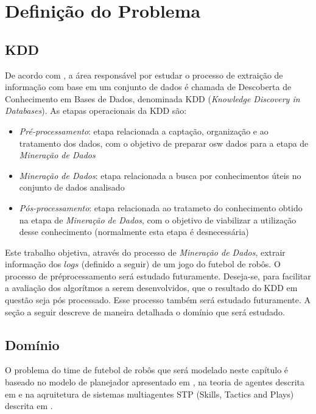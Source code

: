 \chapter{Definição do Problema}\label{cap:def_problema}

\section{KDD}

De acordo com \cite{passos2005datamining}, a área responsável por estudar o processo de extraição de informação com base em um conjunto de dados é
chamada de Descoberta de Conhecimento em Bases de Dados, denominada
KDD (\textit{Knowledge Discovery in Databases}). As etapas operacionais da KDD são:
\begin{itemize}
  \item \textit{Pré-processamento}: etapa relacionada a captação,
        organização e ao tratamento dos dados, com o objetivo de
        preparar osw dados para a etapa de \textit{Mineração de Dados}
  \item \textit{Mineração de Dados}: etapa relacionada a busca por
        conhecimentos úteis no conjunto de dados analisado
  \item \textit{Pós-processamento}: etapa relacionada ao tratameto do
        conhecimento obtido na etapa de \textit{Mineração de Dados}, com
        o objetivo de viabilizar a utilização desse conhecimento
        (normalmente esta etapa é desnecessária)
\end{itemize}

Este trabalho objetiva, através do processo de \textit{Mineração de Dados}, extrair informação dos $logs$ (definido a seguir)
de um jogo do futebol de robôs. O processo de préprocessamento será estudado futuramente. Deseja-se, para facilitar a avaliação dos algorítmos a serem desenvolvidos, que o resultado do KDD em questão seja pós processado. Esse processo também será estudado futuramente.
A seção a seguir descreve de maneira detalhada o domínio que será estudado.

\section{Domínio}

O problema do time de futebol de robôs que será modelado neste capítulo é baseado no modelo de planejador apresentado em \cite{zickler}, na teoria
de agentes descrita em \cite{russellnorvig} e na aqruitetura
de sistemas multiagentes STP (Skills, Tactics and Plays) descrita em \cite{bowling2003plays}.



